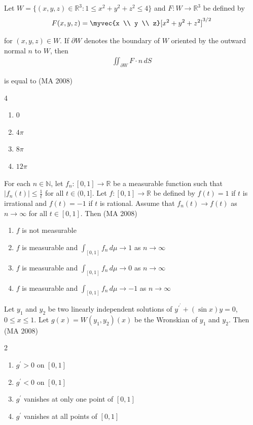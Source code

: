 \item
Let $W = \{ (x, y, z) \in \mathbb{R}^3 : 1 \leq x^2 + y^2 + z^2 \leq 4 \}$ and $F: W \rightarrow \mathbb{R}^3$ be defined by
\begin{align}
    F(x, y, z) = \myvec{x \\ y \\ z} [x^2 + y^2 + z^2]^{3/2}
\end{align}

for $(x, y, z) \in W$. If $\partial W$ denotes the boundary of $W$ oriented by the outward normal $n$ to $W$, then 
\begin{align}
    \iint_{\partial W} F \cdot n \, dS
\end{align}

is equal to
\hfill (MA 2008)
\begin{multicols}{4}
\begin{enumerate}
    \item $0$
    \item $4\pi$
    \item $8\pi$
    \item $12\pi$
\end{enumerate}
\end{multicols}


\item
For each $n \in \mathbb{N}$, let $f_n : [0,1] \to \mathbb{R}$ be a measurable function such that $|f_n(t)| \leq \frac{1}{t}$ for all $t \in (0,1]$. Let $f : [0,1] \to \mathbb{R}$ be defined by $f(t) = 1$ if $t$ is irrational and $f(t) = -1$ if $t$ is rational. Assume that $f_n(t) \to f(t)$ as $n \to \infty$ for all $t \in [0,1]$. Then
\hfill (MA 2008)

\begin{enumerate}
    \item $f$ is not measurable
    \item $f$ is measurable and $\int_{[0,1]} f_n \, d\mu \to 1$ as $n\to\infty$
    \item $f$ is measurable and $\int_{[0,1]} f_n \, d\mu \to 0$ as $n\to\infty$
    \item $f$ is measurable and $\int_{[0,1]} f_n \, d\mu \to -1$ as $n\to\infty$
\end{enumerate}

\item
Let $y_1$ and $y_2$ be two linearly independent solutions of $y^{\prime}^{\prime} + (\sin x)y = 0$, $0 \leq x \leq 1$. Let $g(x) = W(y_1, y_2)(x)$ be the Wronskian of $y_1$ and $y_2$. Then
\hfill (MA 2008)
\begin{multicols}{2}
\begin{enumerate}
    \item $g^{\prime} > 0$ on $[0,1]$
    \item $g^{\prime} < 0$ on $[0,1]$
    \item $g^{\prime}$ vanishes at only one point of $[0,1]$
    \item $g^{\prime}$ vanishes at all points of $[0,1]$
\end{enumerate}
\end{multicols}


